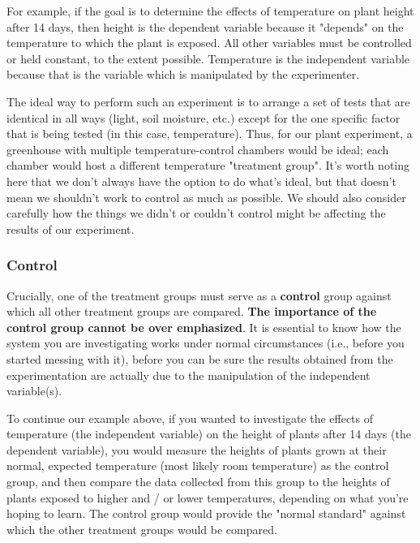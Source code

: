 \documentclass[
]{book}
\begin{document}
For example, if the goal is to determine the effects of temperature on plant height after 14 days, then height is the dependent variable because it "depends" on the temperature to which the plant is exposed. All other variables must be controlled or held constant, to the extent possible. Temperature is the independent variable because that is the variable which is manipulated by the experimenter.

The ideal way to perform such an experiment is to arrange a set of tests that are identical in all ways (light, soil moisture, etc.) except for the one specific factor that is being tested (in this case, temperature). Thus, for our plant experiment, a greenhouse with multiple temperature-control chambers would be ideal; each chamber would host a different temperature "treatment group". It's worth noting here that we don't always have the option to do what's ideal, but that doesn't mean we shouldn't work to control as much as possible. We should also consider carefully how the things we didn't or couldn't control might be affecting the results of our experiment.

\hypertarget{control}{%
\subsubsection*{Control}\label{control}}

Crucially, one of the treatment groups must serve as a \textbf{control} group against which all other treatment groups are compared. \textbf{The importance of the control group cannot be over emphasized}. It is essential to know how the system you are investigating works under normal circumstances (i.e., before you started messing with it), before you can be sure the results obtained from the experimentation are actually due to the manipulation of the independent variable(s).

To continue our example above, if you wanted to investigate the effects of temperature (the independent variable) on the height of plants after 14 days (the dependent variable), you would measure the heights of plants grown at their normal, expected temperature (most likely room temperature) as the control group, and then compare the data collected from this group to the heights of plants exposed to higher and / or lower temperatures, depending on what you're hoping to learn. The control group would provide the "normal standard" against which the other treatment groups would be compared.
\end{document}
